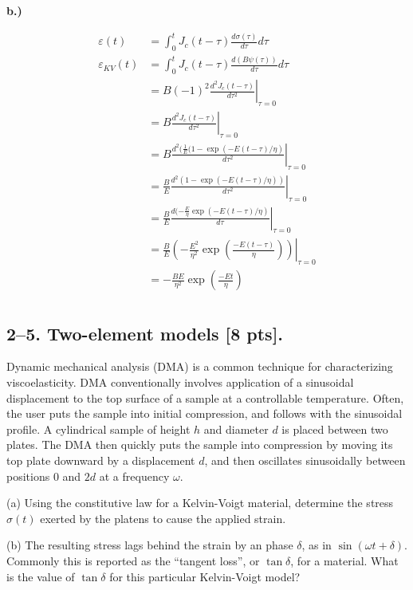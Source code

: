 \textbf{b.)} 

\begin{align*}
    \varepsilon(t) &= \int_0^t J_c(t-\tau)\frac{d\sigma(\tau)}{d\tau}d\tau \\
    \varepsilon_{KV}(t) &=  \int_0^t J_c(t-\tau)\frac{d(B\psi(\tau))}{d\tau}d\tau \\
    &= B (-1)^2\left.\frac{d^2J_c(t-\tau)}{d\tau^2}\right|_{\tau=0} \\
    &= B \left.\frac{d^2J_c(t-\tau)}{d\tau^2}\right|_{\tau=0} \\
    &= B \left.\frac{d^2(\frac{1}{E}(1-\exp(-E(t-\tau)/\eta)}{d\tau^2}\right|_{\tau=0} \\
    &= \frac{B}{E} \left.\frac{d^2(1-\exp(-E(t-\tau)/\eta))}{d\tau^2}\right|_{\tau=0} \\
    &= \left. \frac{B}{E} \frac{d(-\frac{E}{\eta} \exp(-E(t-\tau)/\eta)}{d\tau}\right|_{\tau=0}\\
    &= \left. \frac{B}{E} \left(-\frac{E^2}{\eta^2}\exp\left(\frac{-E(t-\tau)}{\eta}\right)\right) \right|_{\tau=0} \\
    &= -\frac{BE}{\eta^2} \exp\left(\frac{-Et}{\eta}\right) \\
\end{align*}


\bigskip
\subsection*{2--5. \textbf{Two-element models} [8 pts].}

Dynamic mechanical analysis (DMA) is a common technique for characterizing viscoelasticity. 
DMA conventionally involves application of a sinusoidal displacement to the top surface of a sample at a controllable temperature. 
Often, the user puts the sample into initial compression, and follows with the sinusoidal profile. 
A cylindrical sample of height $h$ and diameter $d$ is placed between two plates.
The DMA then quickly puts the sample into compression by moving its top plate downward by a displacement $d$, and then oscillates sinusoidally between positions $0$ and $2d$ at a frequency $\omega$.

\medskip
(a) Using the constitutive law for a Kelvin-Voigt material, determine the stress $\sigma(t)$ exerted by the platens to cause the applied strain. 

\medskip
(b) The resulting stress lags behind the strain by an phase $\delta$, as in $\sin(\omega t + \delta)$. 
Commonly this is reported as the ``tangent loss'', or $\tan\delta$, for a material. 
What is the value of $\tan\delta$ for this particular Kelvin-Voigt model?

